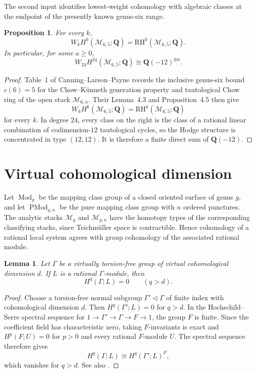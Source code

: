 \documentclass[11pt,reqno]{amsart}
\newcommand{\Q}{\mathbf{Q}}
\newcommand{\M}{\mathcal{M}}
\newcommand{\RH}{\mathrm{RH}}
\newcommand{\Mod}{\operatorname{Mod}}
\newcommand{\PMod}{\operatorname{PMod}}
\newtheorem{proposition}[theorem]{Proposition}
\newtheorem{lemma}[theorem]{Lemma}
\theoremstyle{definition}
\theoremstyle{remark}
\begin{document}
The second input identifies lowest-weight cohomology with algebraic classes
at the endpoint of the presently known genus-six range.

\begin{proposition}\label{prop:algebraic}
For every $k$,
\[
  W_kH^k(\M_{6,5};\Q)=\RH^k(\M_{6,5};\Q).
\]
In particular, for some $a\geq0$,
\[
  W_{24}H^{24}(\M_{6,5};\Q)
  \cong \Q(-12)^{\oplus a}.
\]
\end{proposition}

\begin{proof}
Table~1 of Canning--Larson--Payne records the inclusive genus-six bound
$c(6)=5$ for the Chow--K\"unneth generation property and tautological Chow
ring of the open stack $\M_{6,n}$.  Their Lemma~4.3 and Proposition~4.5 then
give
\cite[Table~1, Lemma~4.3, and Proposition~4.5]{CanningLarsonPayne}
\[
  W_kH^k(\M_{6,5};\Q)=\RH^k(\M_{6,5};\Q)
\]
for every $k$.  In degree $24$, every
class on the right is the class of a rational linear combination of
codimension-$12$ tautological cycles, so the Hodge structure is concentrated
in type $(12,12)$.  It is therefore a finite direct sum of $\Q(-12)$.
\end{proof}

\section{Virtual cohomological dimension}

Let $\Mod_g$ be the mapping class group of a closed oriented surface of genus
$g$, and let $\PMod_{g,n}$ be the pure mapping class group with $n$ ordered
punctures.  The analytic stacks $\M_g$ and $\M_{g,n}$ have the homotopy types
of the corresponding classifying stacks, since Teichm\"uller space is
contractible.  Hence cohomology of a rational local system agrees with group
cohomology of the associated rational module.

\begin{lemma}\label{lem:vcdcoeff}
Let $\Gamma$ be a virtually torsion-free group of virtual cohomological
dimension $d$.  If $L$ is a rational $\Gamma$-module, then
\[
  H^q(\Gamma;L)=0\qquad(q>d).
\]
\end{lemma}

\begin{proof}
Choose a torsion-free normal subgroup $\Gamma'\triangleleft\Gamma$ of finite
index with cohomological dimension $d$.  Then
$H^q(\Gamma';L)=0$ for $q>d$.  In the Hochschild--Serre spectral sequence for
$1\to\Gamma'\to\Gamma\to F\to1$, the group $F$ is finite.  Since the
coefficient field has characteristic zero, taking $F$-invariants is exact and
$H^p(F;U)=0$ for $p>0$ and every rational $F$-module $U$.  The spectral
sequence therefore gives
\[
  H^q(\Gamma;L)\cong H^q(\Gamma';L)^F,
\]
which vanishes for $q>d$.  See also \cite[Chapter~VII]{BrownGroups}.
\end{proof}
\end{document}
